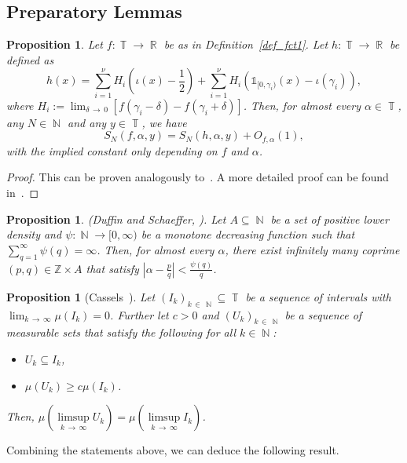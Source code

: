 \documentclass[10pt,a4paper]{amsart}
\numberwithin{equation}{section}
\DeclareMathOperator{\R}{\mathbb{R}}
\DeclareMathOperator{\N}{\mathbb{N}}
\DeclareMathOperator{\T}{\mathbb{T}}
\newcommand{\bbZ}{\mathbb{Z}}
\newtheorem{prop}[theo]{Proposition}
\theoremstyle{definition}
\begin{document}
\subsection{Preparatory Lemmas}\label{Sec_prepLemmas}

\begin{prop}\label{LemRepresentationf}
Let $f : \T \rightarrow \R$ be as in Definition~\ref{def_fct1}. Let $h:\T \to \R$ be defined as
\[
h(x) = \sum_{i=1}^{\nu} H_i\left (\iota(x) - \frac{1}{2} \right) + \sum_{i=1}^{\nu} H_i \left(\mathds{1}_{[0, \gamma_i)}(x) -\iota(\gamma_i) \right),
\]
where $H_i := \lim_{\delta\,\rightarrow\,0} [f(\gamma_i - \delta) - f(\gamma_i + \delta)]$. Then, for almost every $\alpha \in \T$, any $N \in \N$ and any $y \in \T$, we have
\[
S_N(f,\alpha,y) = S_N(h,\alpha,y) + O_{f, \alpha}(1),
\]
with the implied constant only depending on $f$ and $\alpha$.
\end{prop}

\begin{proof}
This can be proven analogously to~\cite[Lemma~3.1]{upper_dens}. A more detailed proof can be found in~\cite[Appendix~A]{quenched}.
\end{proof}

\begin{prop}\label{ds_thm}
(Duffin and Schaeffer, \cite[Theorem~3]{duff_sch}).
Let $A \subseteq \N$ be a set of positive lower density and $\psi: \N \to [0,\infty)$ be a monotone decreasing function such that $\sum_{q =1}^{\infty} \psi(q) = \infty$. Then, for almost every $\alpha$, there exist infinitely many coprime $(p,q) \in \bbZ \times A$ that satisfy $| \alpha - \frac{p}{q}| < \frac{\psi(q)}{q}$.
\end{prop}

\begin{prop}[{Cassels~\cite[Lemma~9]{cassels}}]\label{gallagher}
Let $(I_k)_{k\,\in\,\N} \subseteq \T$ be a sequence of intervals with $\lim_{k\,\to\,\infty} \mu(I_k) = 0$. Further let $c > 0$ and $(U_k)_{k\,\in\,\N}$ be a sequence of measurable sets that satisfy the following for all $k \in \N$:
\begin{itemize}
\item $U_k \subseteq I_k$,
\item $\mu(U_k) \geq c \mu(I_k)$.
\end{itemize}
Then, $\mu(\limsup\limits_{k\,\to\,\infty} U_k) = \mu(\limsup\limits_{k\,\to\,\infty} I_k)$.
\end{prop}


Combining the statements above, we can deduce the following result.
\end{document}
